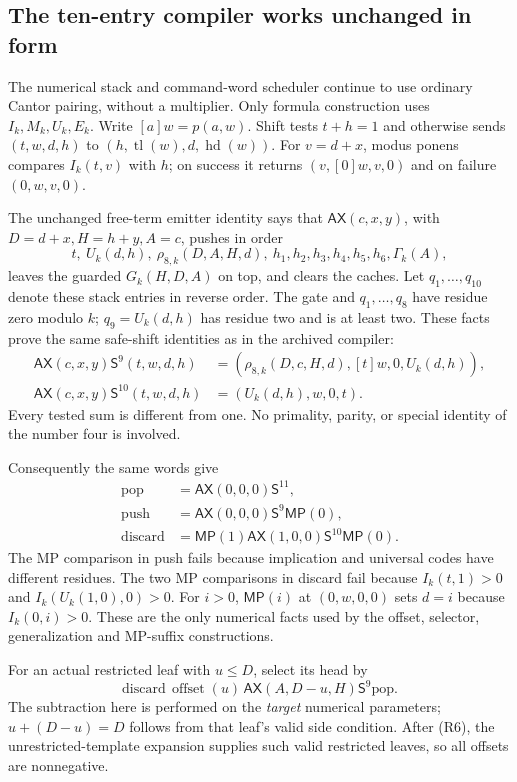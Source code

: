 \subsection{The ten-entry compiler works unchanged in form}

The numerical stack and command-word scheduler continue to use
ordinary Cantor pairing, without a multiplier. Only formula
construction uses $I_k,M_k,U_k,E_k$. Write $[a]w=p(a,w)$.
Shift tests $t+h=1$ and otherwise sends
$(t,w,d,h)$ to $(h,\operatorname{tl}(w),d,\operatorname{hd}(w))$.
For $v=d+x$, modus ponens compares $I_k(t,v)$ with $h$; on success
it returns $(v,[0]w,v,0)$ and on failure $(0,w,v,0)$.

The unchanged free-term emitter identity says that
$\mathsf{AX}(c,x,y)$, with $D=d+x,H=h+y,A=c$, pushes in order
\[
 t,\ U_k(d,h),\ \rho_{8,k}(D,A,H,d),\ h_1,h_2,h_3,h_4,h_5,h_6,
 \Gamma_k(A),
\]
leaves the guarded $G_k(H,D,A)$ on top, and clears the caches.
Let $q_1,\ldots,q_{10}$ denote these stack entries in reverse order.
The gate and $q_1,\ldots,q_8$ have residue zero modulo $k$;
$q_9=U_k(d,h)$ has residue two and is at least two. These facts
prove the same safe-shift identities as in the archived compiler:
\begin{align*}
 \mathsf{AX}(c,x,y)\mathsf S^9(t,w,d,h)
   &=(\rho_{8,k}(D,c,H,d),[t]w,0,U_k(d,h)),\\
 \mathsf{AX}(c,x,y)\mathsf S^{10}(t,w,d,h)
   &=(U_k(d,h),w,0,t).
\end{align*}
Every tested sum is different from one. No primality, parity, or
special identity of the number four is involved.

Consequently the same words give
\begin{align*}
 \mathrm{pop}&=\mathsf{AX}(0,0,0)\mathsf S^{11},\\
 \mathrm{push}&=\mathsf{AX}(0,0,0)\mathsf S^9\mathsf{MP}(0),\\
 \mathrm{discard}&=\mathsf{MP}(1)\mathsf{AX}(1,0,0)
                                      \mathsf S^{10}\mathsf{MP}(0).
\end{align*}
The MP comparison in push fails because implication and universal
codes have different residues. The two MP comparisons in discard
fail because $I_k(t,1)>0$ and $I_k(U_k(1,0),0)>0$.
For $i>0$, $\mathsf{MP}(i)$ at $(0,w,0,0)$ sets $d=i$ because
$I_k(0,i)>0$. These are the only numerical facts used by the
offset, selector, generalization and MP-suffix constructions.

For an actual restricted leaf with $u\leq D$, select its head by
\[
 \mathrm{discard}\,\operatorname{offset}(u)\,
 \mathsf{AX}(A,D-u,H)\mathsf S^9\mathrm{pop}.
\]
The subtraction here is performed on the \emph{target} numerical
parameters; $u+(D-u)=D$ follows from that leaf's valid side condition.
After (R6), the unrestricted-template expansion supplies such valid
restricted leaves, so all offsets are nonnegative.

